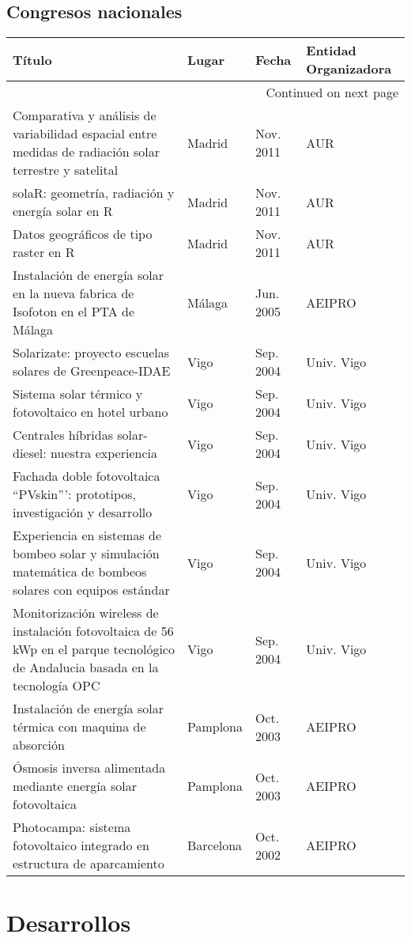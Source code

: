 \documentclass[article, a4paper]{memoir}
\begin{document}
\subsection{Congresos nacionales}
\label{sec-6-2}
\begin{longtable}{p{87mm}|p{30mm}|p{15mm}|p{30mm}}
Título & Lugar & Fecha & Entidad Organizadora\\
\hline
\endhead
\hline\multicolumn{4}{r}{Continued on next page} \\
\endfoot
\endlastfoot
Comparativa y análisis de variabilidad espacial entre medidas de radiación solar terrestre y satelital & Madrid & Nov. 2011 & AUR\\
solaR: geometría, radiación y energía solar en R & Madrid & Nov. 2011 & AUR\\
Datos geográficos de tipo raster en R & Madrid & Nov. 2011 & AUR\\
Instalación de energía solar en la nueva fabrica de Isofoton en el PTA de Málaga & Málaga & Jun. 2005 & AEIPRO\\
Solarizate: proyecto escuelas solares de Greenpeace-IDAE & Vigo & Sep. 2004 & Univ. Vigo\\
Sistema solar térmico y fotovoltaico en hotel urbano & Vigo & Sep. 2004 & Univ. Vigo\\
Centrales híbridas solar-diesel: nuestra experiencia & Vigo & Sep. 2004 & Univ. Vigo\\
Fachada doble fotovoltaica ``PVskin''': prototipos, investigación y desarrollo & Vigo & Sep. 2004 & Univ. Vigo\\
Experiencia en sistemas de bombeo solar y simulación matemática de bombeos solares con equipos estándar & Vigo & Sep. 2004 & Univ. Vigo\\
Monitorización wireless de instalación fotovoltaica de 56 kWp en el parque tecnológico de Andalucia basada en la tecnología OPC & Vigo & Sep. 2004 & Univ. Vigo\\
Instalación de energía solar térmica con maquina de absorción & Pamplona & Oct. 2003 & AEIPRO\\
Ósmosis inversa alimentada mediante energía solar fotovoltaica & Pamplona & Oct. 2003 & AEIPRO\\
Photocampa: sistema fotovoltaico integrado en estructura de aparcamiento & Barcelona & Oct. 2002 & AEIPRO\\
\end{longtable}



\section{Desarrollos}
\label{sec-7}
\end{document}

